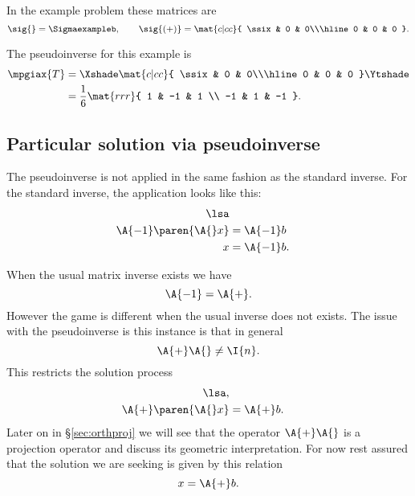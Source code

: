 In the example problem these matrices are
\begin{equation}
  \sig{}= \Sigmaexampleb, \qquad 
  \sig{(+)}= \mat{c|cc}
  {
  \ssix & 0 & 0\\\hline
  0 & 0 & 0
  }.
\end{equation}

The pseudoinverse for this example is
\begin{equation}
  \begin{split}
  \mpgiax{T} &= \Xshade \mat{c|cc}
  {
  \ssix & 0 & 0\\\hline
  0 & 0 & 0
  } \Ytshade \\
  & =
  \frac{1}{6}
  \mat{rrr}
  {
   1 & -1 &  1 \\
  -1 &  1 & -1
  }.
  \end{split}
  \label{eq:simple:mppdecomp}
\end{equation}

\subsection{Particular solution via pseudoinverse}
\label{sec:pi}
The pseudoinverse is not applied in the same fashion as the standard inverse. For the standard inverse, the application looks like this:
\begin{equation}
  \begin{split}
    \lsa\\
    \A{-1}\paren{\A{}x} & = \A{-1}b\\
    x&= \A{-1}b.
  \end{split}
\end{equation}

When the usual matrix inverse exists we have
\begin{equation}
  \A{-1} = \A{+}.
\end{equation}
However the game is different when the usual inverse does not exists. The issue with the pseudoinverse is this instance is that in general
\begin{equation}
  \A{+}\A{} \ne \I{n}.
\end{equation}
This restricts the solution process
\begin{equation}
  \begin{split}
    \lsa,\\
    \A{+}\paren{\A{}x} & = \A{+}b.\\
  \end{split}
  \label{eq:solution:general}
\end{equation}
Later on in \S\eqref{sec:orthproj} we will see that the operator $\A{+}\A{}$ is a projection operator and discuss its geometric interpretation. For now rest assured that the solution we are seeking is given by this relation
\begin{equation}
  x = \A{+}b.
\end{equation}

